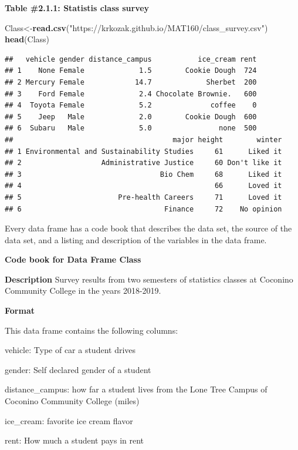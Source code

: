 \documentclass[
]{book}
\newenvironment{Shaded}{\begin{snugshade}}{\end{snugshade}}
\newcommand{\KeywordTok}[1]{\textcolor[rgb]{0.13,0.29,0.53}{\textbf{#1}}}
\newcommand{\NormalTok}[1]{#1}
\newcommand{\StringTok}[1]{\textcolor[rgb]{0.31,0.60,0.02}{#1}}
\begin{document}
\textbf{Table \#2.1.1: Statistis class survey}

\begin{Shaded}
\begin{Highlighting}[]
\NormalTok{Class<-}\KeywordTok{read.csv}\NormalTok{(}\StringTok{"https://krkozak.github.io/MAT160/class_survey.csv"}\NormalTok{)}
\KeywordTok{head}\NormalTok{(Class)}
\end{Highlighting}
\end{Shaded}

\begin{verbatim}
##   vehicle gender distance_campus           ice_cream rent
## 1    None Female             1.5        Cookie Dough  724
## 2 Mercury Female            14.7             Sherbet  200
## 3    Ford Female             2.4 Chocolate Brownie.   600
## 4  Toyota Female             5.2              coffee    0
## 5    Jeep   Male             2.0        Cookie Dough  600
## 6  Subaru   Male             5.0                none  500
##                                      major height        winter
## 1 Environmental and Sustainability Studies     61      Liked it
## 2                   Administrative Justice     60 Don't like it
## 3                                 Bio Chem     68      Liked it
## 4                                              66      Loved it
## 5                       Pre-health Careers     71      Loved it
## 6                                  Finance     72    No opinion
\end{verbatim}

Every data frame has a code book that describes the data set, the source of the data set, and a listing and description of the variables in the data frame.

\textbf{Code book for Data Frame Class}

\textbf{Description}
Survey results from two semesters of statistics classes at Coconino Community College in the years 2018-2019.

\textbf{Format}

This data frame contains the following columns:

vehicle: Type of car a student drives

gender: Self declared gender of a student

distance\_campus: how far a student lives from the Lone Tree Campus of Coconino Community College (miles)

ice\_cream: favorite ice cream flavor

rent: How much a student pays in rent
\end{document}
